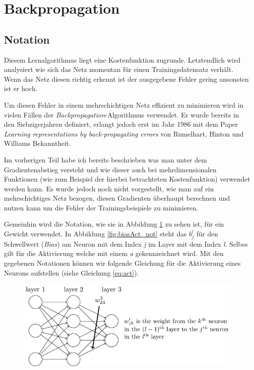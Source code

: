 \section{Backpropagation} \label{sec:backprop}

\subsection{Notation} \label{ss:notationBP}
Diesem Lernalgorithmus liegt eine Kostenfunktion zugrunde. Letztendlich wird analysiert wie sich das Netz momentan für einen Trainingsdatensatz verhält. Wenn das Netz diesen richtig erkennt ist der ausgegebene Fehler gering ansonsten ist er hoch. 

Um diesen Fehler in einem mehrschichtigen Netz effizient zu minimieren wird in vielen Fällen der \emph{Backpropagation}-Algorithmus verwendet. Er wurde bereits in den Siebzigerjahren definiert, erlangt jedoch erst im Jahr 1986 mit dem Paper \emph{Learning representations by back-propagating errors} von Rumelhart, Hinton und Williams Bekanntheit. 

Im vorherigen Teil habe ich bereits beschrieben was man unter dem Gradientenabstieg versteht und wie dieser auch bei mehrdimensionalen Funktionen (wie zum Beispiel der hierbei betrachteten Kostenfunktion) verwendet werden kann. Es wurde jedoch noch nicht vorgestellt, wie man auf ein mehrschichtiges Netz bezogen, diesen Gradienten überhaupt berechnen und nutzen kann um die Fehler der Trainingsbeispiele zu minimieren. 

Gemeinhin wird die Notation, wie sie in Abbildung \ref{fig:weight_not} zu sehen ist, für ein Gewicht verwendet. In Abbildung \ref{fig:biasAct_not} steht das $b^l_j$ für den Schwellwert (\emph{Bias}) am Neuron mit dem Index \emph{j} im Layer mit dem Index \emph{l}. Selbes gilt für die Aktivierung welche mit einem \emph{a} gekennzeichnet wird. Mit den gegebenen Notationen können wir folgende Gleichung für die Aktivierung eines Neurons aufstellen (siehe Gleichung \ref{eq:act}). 

\begin{figure}[!htb]
	\centering
	\includegraphics[width=.7\linewidth]{img/weight_notation}
	\label{fig:weight_not}
\end{figure}


